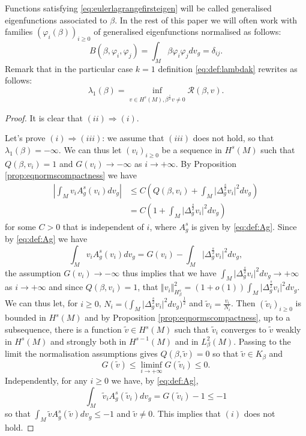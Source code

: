 \documentclass[10pt]{amsart}
\numberwithin{equation}{section}
\newcommand{\vp}{\varphi}
\theoremstyle{plain}
\theoremstyle{remark}
\begin{document}
Functions satisfying \eqref{eq:eulerlagrangefirsteigen} will be called generalised eigenfunctions associated to $\beta$. In the rest of this paper we will often work with families $(\vp_i(\beta))_{i \ge 0}$ of generalised eigenfunctions normalised as follows:
$$ B(\beta, \vp_i, \vp_j) = \int_M \beta \vp_i \vp_j dv_g = \delta_{ij}. $$
Remark that in the particular case $k=1$ definition \eqref{eq:def:lambdak} rewrites as follows: 
$$ \lambda_1(\beta)= \inf_{v \in H^s(M), \beta^{\frac12} v \neq 0}   \mathcal{R}(\beta,v).$$


\begin{proof}
It is clear that $(ii)\Rightarrow (i)$. 

Let's prove $(i)\Rightarrow (iii)$: we assume that $(iii)$ does not hold, so that $\lambda_1(\beta)=-\infty$. We can thus let $(v_i)_{i\ge0} $ be a sequence in $H^s(M)$ such that $Q(\beta,v_i) = 1$ and $G(v_i) \to -\infty$ as $i\to +\infty$. By Proposition \ref{prop:eqnormscompactness}    we have 
$$ \begin{aligned}
\left\vert \int_M v_iA_g^s(v_i)dv_g \right\vert   %
&\le   C   \left(Q(\beta,v_i) +\int_M \big|\Delta_g^{\frac{s}{2}} v_i \big|^2 dv_g\right) \\
&= C \left(1 + \int_M \big|\Delta_g^{\frac{s}{2}} v_i \big|^2 dv_g\right) 
\end{aligned} $$
for some $C>0$ that is independent of $i$, where $A_g^s$ is given by \eqref{eq:def:Ag}. Since by \eqref{eq:def:Ag} we have 
$$ \int_M v_iA_g^s(v_i)dv_g = G(v_i) - \int_M \big|\Delta_g^{\frac{s}{2}} v_i \big|^2 dv_g, $$
the assumption $G(v_i) \to - \infty$ thus implies that we have $\int_M \big|\Delta_g^{\frac{s}{2}} v_i \big|^2 dv_g \to + \infty$ as $i \to + \infty$ and since $Q(\beta, v_i)=1$, that $ \Vert v_i \Vert_{H^s_{\beta}}^2 = (1+o(1)) \int_M \big|\Delta_g^{\frac{s}{2}} v_i \big|^2 dv_g$. We can thus let, for $i \ge 0$, $N_i= \big(\int_M \big|\Delta_g^{\frac{s}{2}} v_i \big|^2 dv_g\big)^{\frac12}$ and  $\tilde{v}_i = \frac{v_i}{N_i}$. Then $(\tilde{v}_i)_{i \ge0}$ is bounded in $H^s(M)$ and by Proposition \ref{prop:eqnormscompactness}, up to a subsequence, there is a function $\tilde{v} \in H^s(M)$ such that $\tilde{v}_i$ converges to $\tilde{v}$ weakly in $H^s(M)$ and strongly both in $H^{s-1}(M)$ and in $L^2_\beta(M)$. Passing to the limit the normalisation assumptions gives $ Q(\beta,\tilde{v}) = 0 $
so that $\tilde{v}\in K_\beta$ and
$$ G(\tilde{v}) \leq \liminf_{i\to+\infty} G(\tilde{v}_i) \leq 0. $$
Independently, for any $i \ge 0$ we have, by \eqref{eq:def:Ag},
$$  \int_M \tilde{v}_i A_g^s(\tilde{v}_i)dv_g = G(\tilde{v}_i) - 1 \leq -1  $$
so that $ \int_M \tilde{v} A_g^s(\tilde{v})dv_g \leq -1 $ and $\tilde{v}\neq 0$. This implies that $(i)$ does not hold.


\end{proof}
\end{document}
